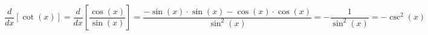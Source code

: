 \documentclass{article.cls} %
\begin{document}
    \begin{equation*} %
        \frac{d}{dx} [\cot (x)] =
        \frac{d}{dx}
        \left[
            \frac{\cos(x)}{\sin(x)}
            \right] =
        \frac{
            -\sin(x) \cdot \sin(x) - \cos(x) \cdot \cos(x)
        }{
            \sin^2(x)
        } =
        -\frac{1}{\sin^2(x)} = -\csc^2(x)
    \end{equation*}
\end{document}
